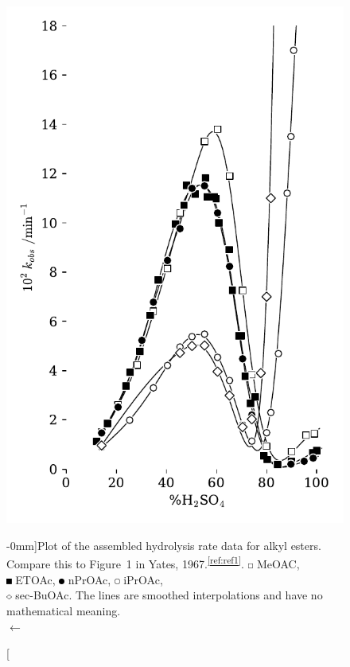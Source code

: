 \documentclass[]{tufte-handout}
\newcommand{\tss}[1]{\textsuperscript{#1}}
\begin{document}
\begin{figure}[h!]
\vspace{0mm}
  \centering
  \includegraphics[scale=0.7]{images/plot5_combo} 
  \caption[][-0mm]{Plot of the assembled hydrolysis rate data for alkyl esters. Compare this to Figure~1 in Yates, 1967.\tss{\ref{ref:ref1}}.
\includegraphics[width=5pt]{images/symbols/OpenSquare} MeOAC, \\
 \includegraphics[width=5pt]{images/symbols/FilledSquare} ETOAc,
 \includegraphics[width=5pt]{images/symbols/FilledCircle} nPrOAc,
 \includegraphics[width=5pt]{images/symbols/OpenCircle} iPrOAc,\\
  \includegraphics[width=5pt]{images/symbols/OpenDiamond} sec-BuOAc. The lines are smoothed interpolations and have no mathematical meaning.  \\  $\longleftarrow$\vspace{1mm}}


\end{figure}
\end{document}
